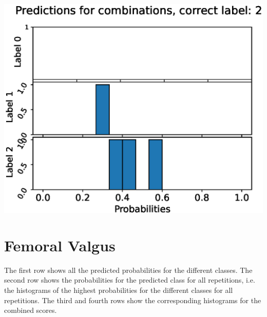 \begin{center}
\begin{minipage}{0.33\textwidth}
  \includegraphics[width=\textwidth]{files/figs/app/hists/pelvis/pc2.eps}
\end{minipage}
\end{center}

\newpage
\section{Femoral Valgus}
The first row shows all the predicted probabilities for the different classes. The second row shows the probabilities for the predicted class for all repetitions, i.e. the histograms of the highest probabilities for the different classes for all repetitions. The third and fourth rows show the corresponding histograms for the combined scores.

